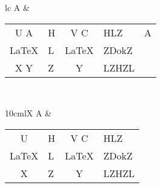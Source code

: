 \documentclass{article}
\begin{document}
  \bfseries

\begin{tabular}{lC}
    A &
    {%
    \begin{tabular}{|cTCTC|}        \hline
    U \relax A      & H & V  C  & HLZ   & A   \\
    \LaTeX & L & \LaTeX & ZD{{ok}}Z \\
    X \unskip Y     & Z & \hbox\bgroup Y\egroup      & LZHZL    \\ \hline
    \end{tabular}} \\
\end{tabular}

\begin{tabularx}{10cm}{lX}
    A &
    {%
    \begin{tabular}{|cTCT|}        \hline
    U      & H & V  C  & HLZ     \\
    \LaTeX & L & \LaTeX & ZD{{ok}}Z \\
    X      & Z & \hbox\bgroup Y\egroup      & LZHZL    \\ \hline
    \end{tabular}} \\
\end{tabularx}
\end{document}
